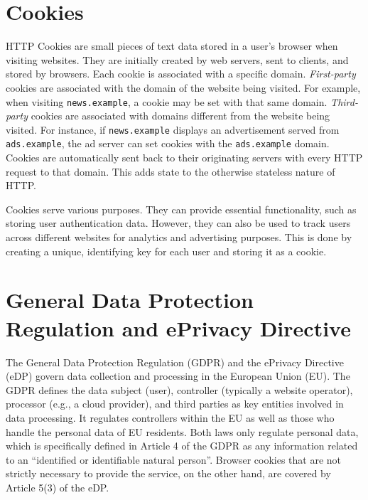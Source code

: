 \section{Cookies}
HTTP Cookies are small pieces of text data stored in a user's browser when visiting websites. 
They are initially created by web servers, sent to clients, and stored by browsers. 
Each cookie is associated with a specific domain.
\emph{First-party} cookies are associated with the domain of the website being visited.
For example, when visiting \texttt{news.example}, a cookie may be set with that same domain.
\emph{Third-party} cookies are associated with domains different from the website being visited. 
For instance, if \texttt{news.example} displays an advertisement served from \texttt{ads.example}, the ad server can set cookies with the \texttt{ads.example} domain.
Cookies are automatically sent back to their originating servers with every HTTP request to that domain. 
This adds state to the otherwise stateless nature of HTTP.

Cookies serve various purposes. 
They can provide essential functionality, such as storing user authentication data. 
However, they can also be used to track users across different websites for analytics and advertising purposes.
This is done by creating a unique, identifying key for each user and storing it as a cookie.

\section{General Data Protection Regulation and ePrivacy Directive} \label{sec:legal}
The General Data Protection Regulation (GDPR) and the ePrivacy Directive (eDP) govern data collection and processing in the European Union (EU).
The GDPR defines the data subject (user), controller (typically a website operator), processor (e.g., a cloud provider), and third parties as key entities involved in data processing.
It regulates controllers within the EU as well as those who handle the personal data of EU residents.
Both laws only regulate personal data, which is specifically defined in Article 4 of the GDPR as any information related to an \enquote{identified or identifiable natural person}.
Browser cookies that are not strictly necessary to provide the service, on the other hand, are covered by Article 5(3) of the eDP.

